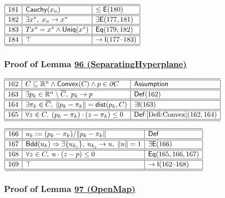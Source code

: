 \documentclass[11pt,reqno]{amsart}
\begin{document}
\noindent$%
\begin{array}{|r|l|l|}
\hline\hline
181 & \mathsf{Cauchy}(x_{n}) & \le\mathsf{E}(180) \\ \hline\hline
182 & \exists x^{*},\;x_{n}\to x^{*} & \exists\mathsf{E}(177,181) \\ \hline\hline
183 & Tx^{*}=x^{*}\wedge\mathsf{Uniq}(x^{*}) & \mathsf{Eq}(179,182) \\ \hline\hline
184 & \top & \to\mathsf{I}(177\text{--}183) \\ \hline\hline
\end{array}%
$

\medskip

\subsubsection*{Proof of Lemma \hyperlink{lem:SeparatingHyperplane}{96 (\textsf{SeparatingHyperplane})}}

\noindent$%
\begin{array}{|r|l|l|}
\hline\hline
162 & C\subseteq\mathbb{R}^{n}\wedge\mathsf{Convex}(C)\wedge p\in\partial C & \textsf{Assumption} \\ \hline\hline
163 & \exists p_{k}\in\mathbb{R}^{n}\setminus\overline{C},\;p_{k}\to p & \mathsf{Def}(162) \\ \hline\hline
164 & \exists\pi_{k}\in\overline{C},\;\|p_{k}-\pi_{k}\|=\mathsf{dist}(p_{k},C) & \exists\mathsf{I}(163) \\ \hline\hline
165 & \forall z\in C,\;(p_{k}-\pi_{k})\cdot(z-\pi_{k})\le0 & \textsf{Def:}\ref{Defi:Convex}(162,164) \\ \hline\hline
\end{array}%
$

\medskip

\noindent$%
\begin{array}{|r|l|l|}
\hline\hline
166 & u_{k}:=(p_{k}-\pi_{k})/\|p_{k}-\pi_{k}\| & \mathsf{Def} \\ \hline\hline
167 & \mathsf{Bdd}(u_{k})\Rightarrow\exists\{u_{k_{j}}\},\;u_{k_{j}}\to u,\;\|u\|=1 & \exists\mathsf{E}(166) \\ \hline\hline
168 & \forall z\in C,\;u\cdot(z-p)\le0 & \mathsf{Eq}(165,166,167) \\ \hline\hline
169 & \top & \to\mathsf{I}(162\text{--}168) \\ \hline\hline
\end{array}%
$

\medskip

\subsubsection*{Proof of Lemma \hyperlink{lem:OpenMap}{97 (\textsf{OpenMap})}}
\end{document}
